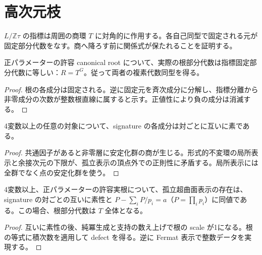 \section{高次元枝}

\begin{definition}[実商環上の指標作用]
\label{def:action}
\leanok
{}
$L/\mathbb Z\tau$ の指標は周囲の商環 $T$ に対角的に作用する。各自己同型で固定される元が固定部分代数をなす。商へ降ろす前に関係式が保たれることを証明する。
\end{definition}

\begin{theorem}[固定環の同定]
\label{thm:fixed}
\leanok
正パラメーターの許容 canonical root について、実際の根部分代数は指標固定部分代数に等しい：$R=T^G$。従って両者の複素代数同型を得る。
\end{theorem}
\begin{proof}
\leanok
{}
根の各成分は固定される。逆に固定元を斉次成分に分解し、指標分離から非零成分の次数が整数根直線に属すると示す。正値性により負の成分は消滅する。
\end{proof}

\begin{theorem}[高次元での互いに素性]
\label{thm:coprime}
\leanok
4変数以上の任意の対象について、signature の各成分は対ごとに互いに素である。
\end{theorem}
\begin{proof}
\leanok
{}
共通因子があると非零層に安定化群の商が生じる。形式的不変環の局所表示と余接次元の下限が、孤立表示の頂点外での正則性に矛盾する。局所表示には全群でなく点の安定化群を使う。
\end{proof}

\begin{theorem}[高次元の必要十分条件]
\label{thm:higher-criterion}
\leanok
4変数以上、正パラメーターの許容実根について、孤立超曲面表示の存在は、signature の対ごとの互いに素性と $P-\sum_iP/p_i=a$（$P=\prod_ip_i$）に同値である。この場合、根部分代数は $T$ 全体となる。
\end{theorem}
\begin{proof}
\leanok
{}
互いに素性の後、純冪生成と支持の数え上げで根の scale が1になる。根の等式に積次数を適用して defect を得る。逆に Fermat 表示で整数データを実現する。
\end{proof}

